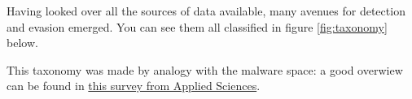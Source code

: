 Having looked over all the sources of data available, many avenues for detection and evasion emerged.
You can see them all classified in figure \ref{fig:taxonomy} below.

This taxonomy was made by analogy with the malware space: a good overwiew can be found in \href{\urlpapermalwaresurvey}{this survey from Applied Sciences}.
